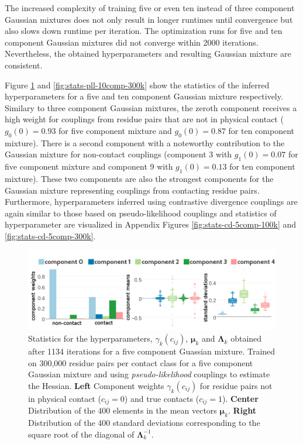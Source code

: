 \documentclass[11pt,a4paper,twoside]{book}
\newcommand{\eq}{\!=\!}
\newcommand{\Lk}{\mathbf{\Lambda}_k}
\newcommand{\muk}{\mathbf{\mu}_k}
\newcommand{\cij}{c_{ij}}
\theoremstyle{definition}
\theoremstyle{definition}
\theoremstyle{remark}
\begin{document}
The increased complexity of training five or even ten instead of three
component Gaussian mixtures does not only result in longer runtimes
until convergence but also slows down runtime per iteration. The
optimization runs for five and ten component Gaussian mixtures did not
converge within 2000 iterations. Nevertheless, the obtained
hyperparameters and resulting Gaussian mixture are consistent.

Figure \ref{fig:stats-pll-5comp-300k} and
\ref{fig:stats-pll-10comp-300k} show the statistics of the inferred
hyperparameters for a five and ten component Gaussian mixture
respectively. Similary to three component Gaussian mixtures, the zeroth
component receives a high weight for couplings from residue pairs that
are not in physical contact (\(g_0(0) \eq 0.93\) for five component
mixture and \(g_0(0) \eq 0.87\) for ten component mixture). There is a
second component with a noteworthy contribution to the Gaussian mixture
for non-contact couplings (component 3 with \(g_1(0) \eq 0.07\) for five
component mixture and component 9 with \(g_1(0) \eq 0.13\) for ten
component mixture). These two components are also the strongest
components for the Gaussian mixture representing couplings from
contacting residue pairs. Furthermore, hyperparameters inferred using
contrastive divergence couplings are again similar to those based on
pseudo-likelihood couplings and statistics of hyperparameter are
visualized in Appendix Figures \ref{fig:stats-cd-5comp-100k} and
\ref{fig:stats-cd-5comp-300k}.












\begin{figure}
\includegraphics[width=1\linewidth]{img/bayesian_model/pll/5/stats-pll-5comp-300k_contactthr25} \caption{Statistics for the hyperparameters,
\(\gamma_k(\cij)\), \(\muk\) and \(\Lk\) obtained after 1134 iterations
for a five component Guassian mixture. Trained on 300,000 residue pairs
per contact class for a five component Gaussian mixture and using
\emph{pseudo-likelihood} couplings to estimate the Hessian.
\textbf{Left} Component weights \(\gamma_k(\cij)\) for residue pairs not
in physical contact (\(\cij \eq 0\)) and true contacts (\(\cij \eq 1\)).
\textbf{Center} Distribution of the 400 elements in the mean vectors
\(\muk\). \textbf{Right} Distribution of the 400 standard deviations
corresponding to the square root of the diagonal of \(\Lk^{-1}\).}\label{fig:stats-pll-5comp-300k}
\end{figure}
\end{document}
